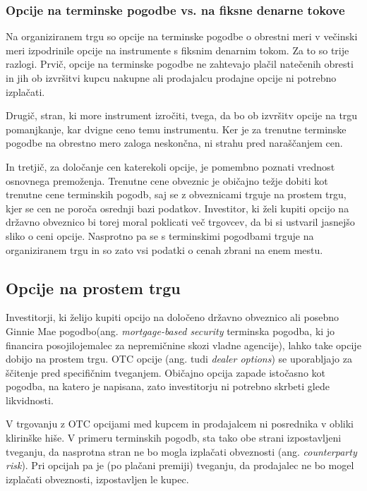 \documentclass[a4paper]{article}
\begin{document}
\subsubsection{Opcije na terminske pogodbe vs. na fiksne denarne tokove}
Na organiziranem trgu so opcije na terminske pogodbe o obrestni meri v večinski meri izpodrinile opcije na instrumente s fiksnim
denarnim tokom. Za to so trije razlogi. Prvič, opcije na terminske pogodbe ne zahtevajo plačil natečenih obresti in jih ob izvršitvi kupcu
nakupne ali prodajalcu prodajne opcije ni potrebno izplačati.

Drugič, stran, ki more instrument izročiti, tvega, da bo ob izvršitv opcije na trgu pomanjkanje, kar dvigne ceno temu instrumentu.
Ker je za trenutne terminske pogodbe na obrestno mero zaloga neskončna, ni strahu pred naraščanjem cen. 

In tretjič, za določanje cen katerekoli opcije, je pomembno poznati vrednost osnovnega premoženja.
Trenutne cene obveznic je običajno težje dobiti kot trenutne cene terminskih pogodb, saj se z obveznicami trguje na prostem trgu, kjer
se cen ne poroča osrednji bazi podatkov. Investitor, ki želi kupiti opcijo na državno obveznico bi torej moral poklicati več trgovcev, 
da bi si ustvaril jasnejšo sliko o ceni opcije. Nasprotno pa se s terminskimi pogodbami trguje na organiziranem trgu in so zato vsi 
podatki o cenah zbrani na enem mestu. 

\subsection{Opcije na prostem trgu}
Investitorji, ki želijo kupiti opcijo na določeno državno obveznico ali posebno Ginnie Mae pogodbo(ang. \textit{mortgage-based security}
terminska pogodba, ki jo financira posojilojemalec za nepremičnine skozi vladne agencije), lahko take opcije dobijo na prostem trgu.
OTC opcije (ang. tudi \textit{dealer options}) se uporabljajo za ščitenje pred specifičnim tveganjem. Običajno opcija zapade istočasno
kot pogodba, na katero je napisana, zato investitorju ni potrebno skrbeti glede likvidnosti.

V trgovanju z OTC opcijami med kupcem in prodajalcem ni posrednika v obliki klirinške hiše. V primeru terminskih pogodb, sta tako
obe strani izpostavljeni tveganju, da nasprotna stran ne bo mogla izplačati obveznosti (ang. \textit{counterparty risk}). Pri opcijah
pa je (po plačani premiji) tveganju, da prodajalec ne bo mogel izplačati obveznosti, izpostavljen le kupec.
\end{document}
